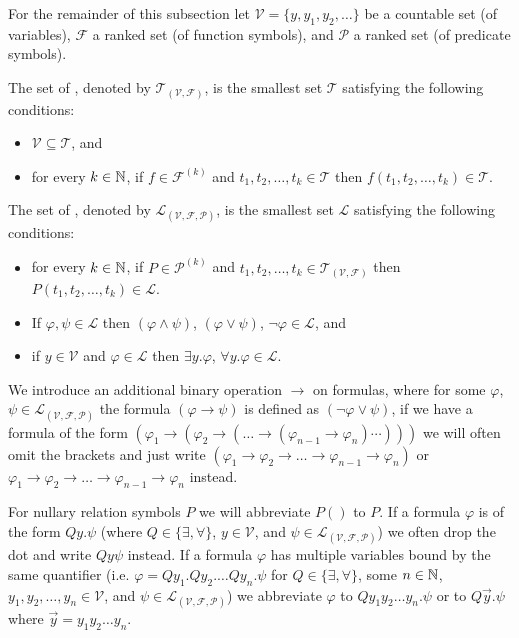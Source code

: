 For the remainder of this subsection let $\mathcal{V}=\{y,y_1,y_2,\dots\}$ be a countable set (of variables), $\mathcal{F}$ a ranked set (of function symbols), and $\mathcal{P}$ a ranked set (of predicate symbols).
\begin{definition}\label{def.2.16}
	The set of , denoted by $\mathcal{T}_{(\mathcal{V},\mathcal{F})}$, is the smallest set $\mathcal{T}$ satisfying the following conditions:
	\begin{itemize}
		\item $\mathcal{V} \subseteq \mathcal{T}$, and
		\item for every $k\in\mathbb{N}$, if $f\in\mathcal{F}^{(k)}$ and $t_1,t_2,\dots,t_k\in\mathcal{T}$ then $f(t_1,t_2,\dots,t_k)\in\mathcal{T}$.
	\end{itemize}
	The set of , denoted by $\mathcal{L}_{(\mathcal{V},\mathcal{F},\mathcal{P})}$, is the smallest set $\mathcal{L}$ satisfying the following conditions:
	\begin{itemize}
		\item for every $k\in\mathbb{N}$, if $P\in\mathcal{P}^{(k)}$ and $t_1,t_2,\dots,t_k\in\mathcal{T}_{(\mathcal{V},\mathcal{F})}$ then $P(t_1,t_2,\dots,t_k)\in\mathcal{L}$.
		\item If $\varphi,\psi\in\mathcal{L}$ then $(\varphi\wedge\psi)$, $(\varphi\vee\psi)$, $\neg \varphi\in\mathcal{L}$, and
		\item if $y\in\mathcal{V}$ and $\varphi\in\mathcal{L}$ then $\exists y.\varphi$, $\forall y.\varphi\in\mathcal{L}$.
	\end{itemize}
\end{definition}
We introduce an additional binary operation $\to$ on formulas, where for some $\varphi$, $\psi\in\mathcal{L}_{(\mathcal{V},\mathcal{F},\mathcal{P})}$ the formula $(\varphi\to\psi)$ is defined as $(\neg\varphi\vee\psi)$, if we have a formula of the form $(\varphi_1\to(\varphi_2\to(\dots \to(\varphi_{n-1}\to \varphi_n)\cdots)))$ we will often omit the brackets and just write $(\varphi_1\to \varphi_2\to\dots\to \varphi_{n-1}\to \varphi_n)$ or $\varphi_1\to \varphi_2\to\dots \to \varphi_{n-1}\to \varphi_n$ instead. 

For nullary relation symbols $P$ we will abbreviate $P()$ to $P$. If a formula $\varphi$ is of the form $Qy.\psi$ (where $Q\in\{\exists,\forall\}$, $y\in\mathcal{V}$, and $\psi\in\mathcal{L}_{(\mathcal{V},\mathcal{F},\mathcal{P})}$) we often drop the dot and write $Qy\psi$ instead. 
If a formula $\varphi$ has multiple variables bound by the same quantifier (i.e. $\varphi=Qy_1.Qy_2.\dots Qy_n.\psi$ for $Q\in\{\exists,\forall\}$, some $n\in\mathbb{N}$, $y_1,y_2,\dots,y_n\in\mathcal{V}$, and $\psi\in\mathcal{L}_{(\mathcal{V},\mathcal{F},\mathcal{P})}$) we abbreviate $\varphi$ to $Qy_1y_2\dots y_n.\psi$ or to $Q\vec{y}.\psi$ where $\vec{y}=y_1y_2\dots y_n$.

